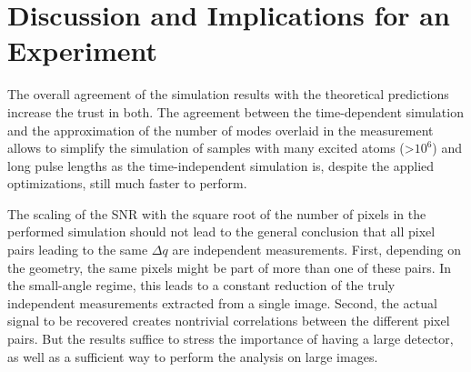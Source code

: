 \section{Discussion and Implications for an Experiment}
The overall agreement of the simulation results with the theoretical predictions increase the trust in both. The agreement between the time-dependent simulation and the approximation of the number of modes overlaid in the measurement allows to simplify the simulation of samples with many excited atoms (>$10^6$) and long pulse lengths as the time-independent simulation is, despite the applied optimizations, still much faster to perform. 

The scaling of the SNR with the square root of the number of pixels in the performed simulation should not lead to the general conclusion that all pixel pairs leading to the same $\Delta q$ are independent measurements. First, depending on the geometry, the same pixels might be part of more than one of these pairs. In the small-angle regime, this leads to a constant reduction of the truly independent measurements extracted from a single image. Second, the actual signal to be recovered creates nontrivial correlations between the different pixel pairs. But the results suffice to stress the importance of having a large detector, as well as a sufficient way to perform the analysis on large images.

